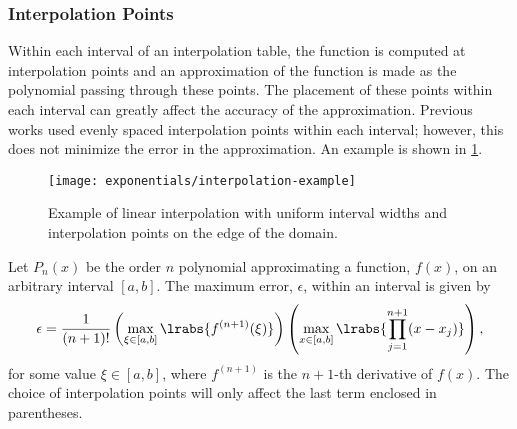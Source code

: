 {{{      \subsubsection{Interpolation Points}{\label{sssec:ET:Interpolation Points}
        Within each interval of an interpolation table, the function is computed at interpolation points and an approximation of the function is made as the polynomial passing through these points.
        The placement of these points within each interval can greatly affect the accuracy of the approximation.
        Previous works \cite{Yamamoto2004,Kochunas2013} used evenly spaced interpolation points within each interval; however, this does not minimize the error in the approximation.
        An example is shown in \cref{fig:LSMOC:ET:Interpolation Example}.

        \begin{figure}
          \centering
          \texttt{[image: exponentials/interpolation-example]}
          \caption{Example of linear interpolation with uniform interval widths and interpolation points on the edge of the domain.\label{fig:LSMOC:ET:Interpolation Example}}
        \end{figure}

        Let $P_n(x)$ be the order $n$ polynomial approximating a function, $f(x)$, on an arbitrary interval $[a,b]$.
        The maximum error, $\epsilon$, within an interval is given by
        \begin{equation}\label{eq:LSMOC:ET:Interpolation Error}
          \epsilon = \frac{1}{(n+1)!}\left(\max_{\xi\in[a,b]}\lrabs{f^{(n+1)}(\xi)}\right)\left(\max_{x\in[a,b]}\lrabs{\prodl[j=1][n+1](x-x_j)}\right),
        \end{equation}
        for some value $\xi\in[a,b]$, where $f^{(n+1)}$ is the $n+1$-th derivative of $f(x)$.
        The choice of interpolation points will only affect the last term enclosed in parentheses.

}}}}
